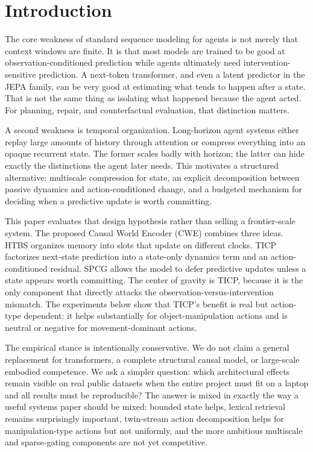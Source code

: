 \documentclass[11pt]{article}
\begin{document}
\section{Introduction}
The core weakness of standard sequence modeling for agents is not merely that context windows are finite. It is that most models are trained to be good at observation-conditioned prediction while agents ultimately need intervention-sensitive prediction. A next-token transformer, and even a latent predictor in the JEPA family, can be very good at estimating what tends to happen after a state. That is not the same thing as isolating what happened because the agent acted. For planning, repair, and counterfactual evaluation, that distinction matters.

A second weakness is temporal organization. Long-horizon agent systems either replay large amounts of history through attention or compress everything into an opaque recurrent state. The former scales badly with horizon; the latter can hide exactly the distinctions the agent later needs. This motivates a structured alternative: multiscale compression for state, an explicit decomposition between passive dynamics and action-conditioned change, and a budgeted mechanism for deciding when a predictive update is worth committing.

This paper evaluates that design hypothesis rather than selling a frontier-scale system. The proposed Causal World Encoder (CWE) combines three ideas. HTBS organizes memory into slots that update on different clocks. TICP factorizes next-state prediction into a state-only dynamics term and an action-conditioned residual. SPCG allows the model to defer predictive updates unless a state appears worth committing. The center of gravity is TICP, because it is the only component that directly attacks the observation-versus-intervention mismatch. The experiments below show that TICP's benefit is real but action-type dependent: it helps substantially for object-manipulation actions and is neutral or negative for movement-dominant actions.

The empirical stance is intentionally conservative. We do not claim a general replacement for transformers, a complete structural causal model, or large-scale embodied competence. We ask a simpler question: which architectural effects remain visible on real public datasets when the entire project must fit on a laptop and all results must be reproducible? The answer is mixed in exactly the way a useful systems paper should be mixed: bounded state helps, lexical retrieval remains surprisingly important, twin-stream action decomposition helps for manipulation-type actions but not uniformly, and the more ambitious multiscale and sparse-gating components are not yet competitive.
\end{document}
